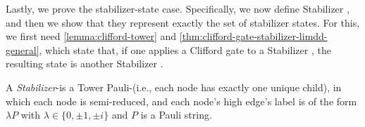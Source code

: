 Lastly, we prove the stabilizer-state case.
Specifically, we now define Stabilizer \limdds, and then we show that they represent exactly the set of stabilizer states.
For this, we first need \autoref{lemma:clifford-tower} and \autoref{thm:clifford-gate-stabilizer-limdd-general}, which state that, if one applies a Clifford gate to a Stabilizer \limdd, the resulting state is another Stabilizer \limdd.
\begin{definition}
	A \emph{Stabilizer}-\limdd is a Tower Pauli-\limdd (i.e., each node has exactly one unique child), in which each node is semi-reduced, and each node's high edge's label is of the form $\lambda P$ with $\lambda\in\{0,\pm 1,\pm i\}$ and $P$ is a Pauli string.
\end{definition}

